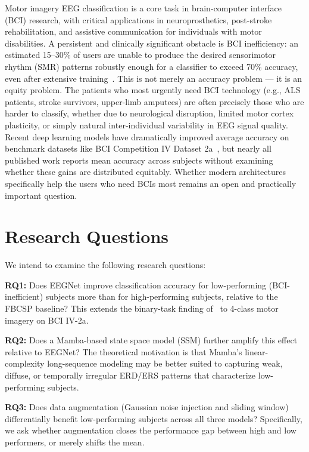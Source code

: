 \documentclass{article}
\begin{document}
Motor imagery EEG classification is a core task in brain-computer interface (BCI) research, with critical applications in neuroprosthetics, post-stroke rehabilitation, and assistive communication for individuals with motor disabilities. A persistent and clinically significant obstacle is BCI inefficiency: an estimated 15--30\% of users are unable to produce the desired sensorimotor rhythm (SMR) patterns robustly enough for a classifier to exceed 70\% accuracy, even after extensive training~\cite{blankertz2009bci,ahn2013theta}. This is not merely an accuracy problem --- it is an equity problem. The patients who most urgently need BCI technology (e.g., ALS patients, stroke survivors, upper-limb amputees) are often precisely those who are harder to classify, whether due to neurological disruption, limited motor cortex plasticity, or simply natural inter-individual variability in EEG signal quality. Recent deep learning models have dramatically improved average accuracy on benchmark datasets like BCI Competition IV Dataset 2a~\cite{tangermann2012review}, but nearly all published work reports mean accuracy across subjects without examining whether these gains are distributed equitably. Whether modern architectures specifically help the users who need BCIs most remains an open and practically important question.

\section{Research Questions}

We intend to examine the following research questions:

\textbf{RQ1:} Does EEGNet improve classification accuracy for low-performing (BCI-inefficient) subjects more than for high-performing subjects, relative to the FBCSP baseline? This extends the binary-task finding of~\cite{nakanishi2022classification} to 4-class motor imagery on BCI IV-2a.

\textbf{RQ2:} Does a Mamba-based state space model (SSM) further amplify this effect relative to EEGNet? The theoretical motivation is that Mamba's linear-complexity long-sequence modeling may be better suited to capturing weak, diffuse, or temporally irregular ERD/ERS patterns that characterize low-performing subjects.

\textbf{RQ3:} Does data augmentation (Gaussian noise injection and sliding window) differentially benefit low-performing subjects across all three models? Specifically, we ask whether augmentation closes the performance gap between high and low performers, or merely shifts the mean.
\end{document}
